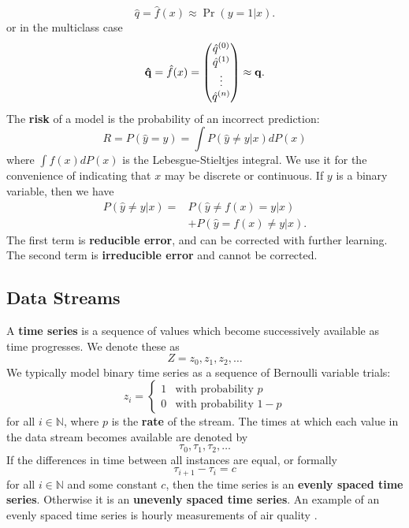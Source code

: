 \begin{equation}
    \hat{q} = \hat{f}(x) \approx \Pr(y=1|x).
\end{equation}
or in the multiclass case
\begin{equation}
    {\bf \hat{q}} = \hat{f}(x) =  \begin{pmatrix}\hat{q}^{(0)}\\\hat{q}^{(1)}\\ \vdots\\\hat{q}^{(n)} \end{pmatrix} \approx {\bf q}.
\end{equation}
The {\bf risk} of a model is the probability of an incorrect prediction:
\begin{equation}
    R = P(\hat{y}=y) = \int P(\hat{y}\ne y|x)dP(x)
\end{equation}
where $\int f(x) dP(x)$ is the Lebesgue-Stieltjes integral. We use it for the convenience of indicating that $x$ may be discrete or continuous. If $y$ is a binary variable, then we have
\begin{align}
    P(\hat{y}\ne y|x) =& P(\hat{y}\ne f(x)=y|x) \\
    &+ P(\hat{y}=f(x)\ne y|x).
\end{align}
The first term is {\bf reducible error}, and can be corrected with further learning. The second term is {\bf irreducible error} and cannot be corrected.

\subsection{Data Streams} \label{setting:data_streams}

A {\bf time series} is a sequence of values which become successively available as time progresses. We denote these as
\begin{equation}
    Z = z_0,z_1,z_2,\dots
\end{equation}
We typically model binary time series as a sequence of Bernoulli variable trials:
\begin{equation}
    z_i = \begin{cases}
    1 & \text{with probability $p$} \\
    0 & \text{with probability $1-p$}
    \end{cases}
\end{equation}
for all $i\in\mathbb{N}$, where $p$ is the {\bf rate} of the stream. The times at which each value in the data stream becomes available are denoted by
\begin{equation}
    \tau_0,\tau_1,\tau_2,\dots
\end{equation}
If the differences in time between all instances are equal, or formally
\begin{equation}
    \tau_{i+1}-\tau_{i} = c
\end{equation}
for all $i\in\mathbb{N}$ and some constant $c$, then the time series is an {\bf evenly spaced time series}. Otherwise it is an {\bf unevenly spaced time series}. An example of an evenly spaced time series is hourly measurements of air quality \cite{ME}.  


